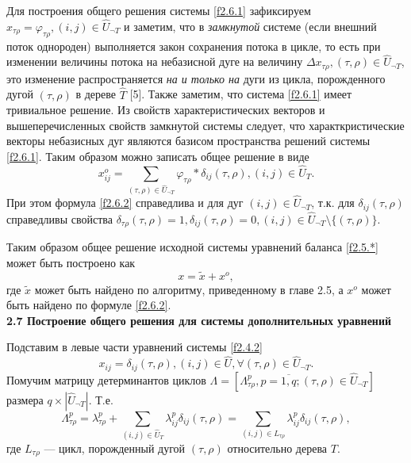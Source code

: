 \documentclass[14pt]{extarticle}%
\begin{document}
Для построения общего решения системы \eqref{f2.6.1} зафиксируем $x_{\tau\rho}=\varphi_{\tau\rho}, (i,j)\in \widehat{U}_{\neg T}$ и заметим, что в {\it замкнутой} системе (если внешний поток однороден) выполняется закон сохранения потока в цикле, то есть при изменении величины потока на небазисной дуге на величину $\Delta x_{\tau\rho}, (\tau,\rho)\in \widehat{U}_{\neg T}$, это изменение распространяется {\it на и только на} дуги из цикла, порожденного дугой $(\tau,\rho)$ в дереве $\widehat{T}$ [5]. Также заметим, что система \eqref{f2.6.1} имеет тривиальное решение. Из свойств характеристических векторов и вышеперечисленных свойств замкнутой системы следует, что характкристические векторы небазисных дуг являются базисом пространства решений системы \eqref{f2.6.1}. Таким образом можно записать общее решение в виде
\begin{equation}\label{f2.6.2}
	x^o_{ij}=\sum_{(\tau,\rho)\in \widehat{U}_{\neg T}}\varphi_{\tau\rho}*\delta_{ij}(\tau,\rho), (i,j)\in \widehat{U}_T.
\end{equation}
При этом формула \eqref{f2.6.2} справедлива и для дуг $(i,j)\in \widehat{U}_{\neg T}$, т.к. для $\delta_{ij}(\tau,\rho)$ справедливы свойства $\delta_{\tau\rho}(\tau,\rho)=1, \delta_{ij}(\tau,\rho)=0, (i,j)\in \widehat{U}_{\neg T}\setminus\{(\tau,\rho)\}$.

Таким образом общее решение исходной системы уравнений баланса \eqref{f2.5.*} может быть построено как 
\begin{equation}\label{f2.6.3}
x=\widetilde x+x^o,
\end{equation}
 где $\widetilde x$ может быть найдено по алгоритму, приведенному в главе 2.5, а $x^o$ может быть найдено по формуле \eqref{f2.6.2}.\\

\textbf{2.7 Построение общего решения для системы дополнительных уравнений}

Подставим в левые части уравнений системы \eqref{f2.4.2}
 $$x_{ij}=\delta_{ij}(\tau,\rho), (i,j)\in \widehat{U}, \forall (\tau,\rho)\in \widehat{U}_{\neg T}.$$
  Помучим матрицу детерминантов циклов $\Lambda=[\Lambda^p_{\tau\rho}, p=\overline{1,q};(\tau,\rho)\in \widehat{U}_{\neg T}]$ размера $q\times |\widehat{U}_{\neg T}|$. Т.е.
\begin{equation}\label{f2.7.1}
	\Lambda^p_{\tau\rho}=\lambda_{\tau\rho}^p+\sum_{(i,j)\in \widehat{U}_T} \lambda_{ij}^p\delta_{ij}(\tau,\rho)=\sum_{(i,j)\in L_{\tau\rho}} \lambda_{ij}^p\delta_{ij}(\tau,\rho),
\end{equation}
где $L_{\tau\rho}$ --- цикл, порожденный дугой $(\tau,\rho)$ относительно дерева $T$.
\end{document}
